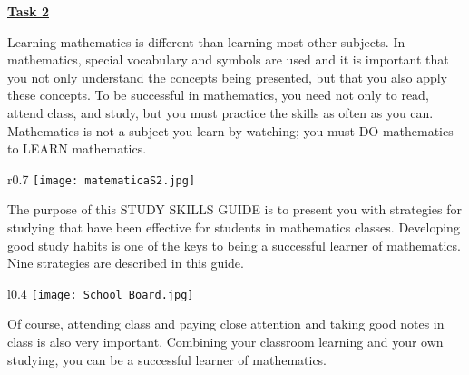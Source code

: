 \documentclass[12pt a4paper]{article}
\begin{document}
\begin{center}

\HUGE \textbf{\uline{Task 2}}

\thispagestyle{empty}
\end{center}


\newpage
\thispagestyle{empty}

    
\begin{Huge}
\end{Huge}

\newpage

\begin{huge}
\noindent \LARGE
Learning mathematics is different than learning most other subjects. In mathematics, special vocabulary and symbols are used and it is important that you not only understand the concepts being presented, but that 
you also apply these concepts. To be successful in mathematics, you need not only to read, attend class, and study, but you must practice the skills as often as you can. Mathematics is not a subject you learn by watching; you must DO mathematics to LEARN mathematics. \\
\begin{wrapfigure}{r}{0.7\textwidth}
    \centering
    \texttt{[image: matematicaS2.jpg]}
    \label{fig: Maths}
\end{wrapfigure}
The purpose of this STUDY SKILLS GUIDE is to present you with strategies for studying that have been effective for students in mathematics classes. Developing good study habits is one of the keys to being a successful learner of mathematics. Nine strategies are described in this guide.

\end{huge}

\newpage

\indent \LARGE 
\begin{wrapfigure}{l}{0.4\textwidth}
    \centering
    \texttt{[image: School\_Board.jpg]}
    \label{fig: Board}
\end{wrapfigure}
Of course, attending class and paying close attention and taking good notes in class is also very important. Combining your classroom learning and your own studying, you can be a successful learner of mathematics. \\
\newline
\end{document}
